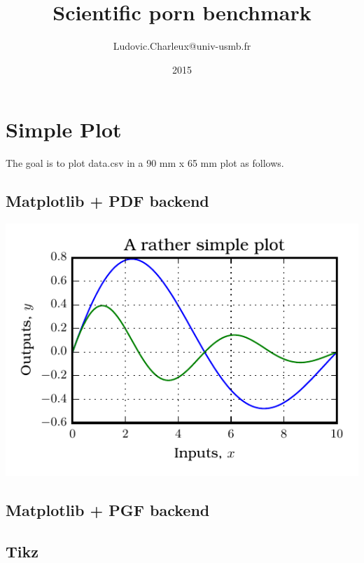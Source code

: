 \documentclass[10pt,a4paper,oneside,onecolumn]{article}
\author{Ludovic.Charleux@univ-usmb.fr}
\title{Scientific porn benchmark}
\date{2015}
\begin{document}
\maketitle
\tableofcontents
\newpage

\section{Simple Plot}

The goal is to plot data.csv in a 90 mm x 65 mm plot as follows.

\subsection{Matplotlib + PDF backend}
\begin{center}
\includegraphics{simple_plot/mpl.pdf}
\end{center}

\subsection{Matplotlib + PGF backend}
\begin{center}

\end{center}

\subsection{Tikz}
\begin{center}

\end{center}
\end{document}
